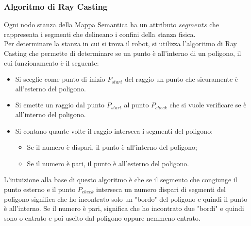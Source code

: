 \subsubsection{Algoritmo di Ray Casting}
Ogni nodo stanza della Mappa Semantica ha un attributo $segments$ che rappresenta i segmenti che delineano i confini della stanza fisica. \\
Per determinare la stanza in cui si trova il robot, si utilizza l'algoritmo di Ray Casting \cite{haines_199424} che permette di determinare se un punto è all'interno di un poligono, il cui funzionamento è il seguente:
\begin{itemize}
	\item Si sceglie come punto di inizio $P_{start}$ del raggio un punto che sicuramente è all'esterno del poligono.
	\item Si emette un raggio dal punto $P_{start}$ al punto $P_{check}$ che si vuole verificare se è all'interno del poligono.
	\item Si contano quante volte il raggio interseca i segmenti del poligono:
	      \begin{itemize}
		      \item Se il numero è dispari, il punto è all'interno del poligono;
		      \item Se il numero è pari, il punto è all'esterno del poligono.
	      \end{itemize}
\end{itemize}
L'intuizione alla base di questo algoritmo è che se il segmento che congiunge il punto esterno e il punto $P_{check}$ interseca un numero dispari di segmenti del poligono significa che ho incontrato solo un "bordo" del poligono e quindi il punto è all'interno. Se il numero è pari, significa che ho incontrato due "bordi" e quindi sono o entrato e poi uscito dal poligono oppure nemmeno entrato.

